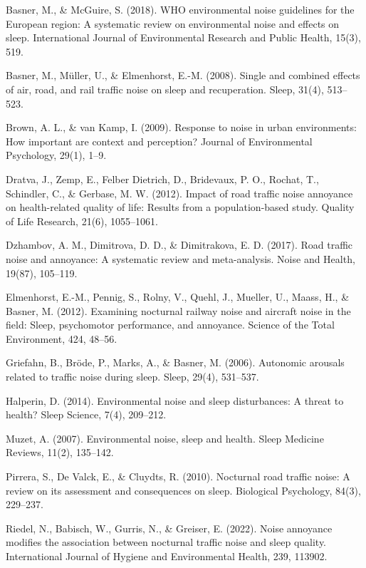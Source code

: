 \begin{thebibliography}{9}
Basner, M., \& McGuire, S. (2018). WHO environmental noise guidelines for the European region: A systematic review on environmental noise and effects on sleep. International Journal of Environmental Research and Public Health, 15(3), 519.

Basner, M., Müller, U., \& Elmenhorst, E.-M. (2008). Single and combined effects of air, road, and rail traffic noise on sleep and recuperation. Sleep, 31(4), 513–523.

Brown, A. L., \& van Kamp, I. (2009). Response to noise in urban environments: How important are context and perception? Journal of Environmental Psychology, 29(1), 1–9.

Dratva, J., Zemp, E., Felber Dietrich, D., Bridevaux, P. O., Rochat, T., Schindler, C., \& Gerbase, M. W. (2012). Impact of road traffic noise annoyance on health-related quality of life: Results from a population-based study. Quality of Life Research, 21(6), 1055–1061.

Dzhambov, A. M., Dimitrova, D. D., \& Dimitrakova, E. D. (2017). Road traffic noise and annoyance: A systematic review and meta-analysis. Noise and Health, 19(87), 105–119.

Elmenhorst, E.-M., Pennig, S., Rolny, V., Quehl, J., Mueller, U., Maass, H., \& Basner, M. (2012). Examining nocturnal railway noise and aircraft noise in the field: Sleep, psychomotor performance, and annoyance. Science of the Total Environment, 424, 48–56.

Griefahn, B., Bröde, P., Marks, A., \& Basner, M. (2006). Autonomic arousals related to traffic noise during sleep. Sleep, 29(4), 531–537.

Halperin, D. (2014). Environmental noise and sleep disturbances: A threat to health? Sleep Science, 7(4), 209–212.

Muzet, A. (2007). Environmental noise, sleep and health. Sleep Medicine Reviews, 11(2), 135–142.

Pirrera, S., De Valck, E., \& Cluydts, R. (2010). Nocturnal road traffic noise: A review on its assessment and consequences on sleep. Biological Psychology, 84(3), 229–237.

Riedel, N., Babisch, W., Gurris, N., \& Greiser, E. (2022). Noise annoyance modifies the association between nocturnal traffic noise and sleep quality. International Journal of Hygiene and Environmental Health, 239, 113902.


\end{thebibliography}
